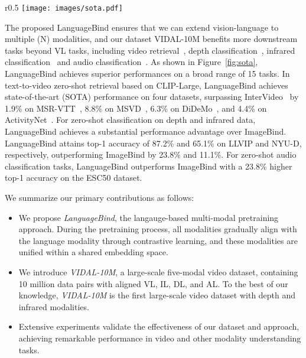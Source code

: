 \documentclass{article} \usepackage{iclr2024_conference,times}
\begin{document}
\begin{wrapfigure}{r}{0.5\textwidth} 
\centering
    \texttt{[image: images/sota.pdf]} 
    \caption{LanguageBind achieves superior performances on a broad range of \textbf{15 benchmarks} across video, audio, depth and infrared.} \label{fig:sota}
\end{wrapfigure}
The proposed LanguageBind ensures that we can extend vision-language to multiple (N) modalities, and our dataset VIDAL-10M benefits more downstream tasks beyond VL tasks, including video retrieval~\citep{luo2022clip4clip}, depth classification~\citep{cao2017estimating}, infrared classification~\citep{baffa2018convolutional} and audio classification~\citep{palanisamy2020rethinking}. As shown in Figure~\ref{fig:sota}, LanguageBind achieves superior performances on a broad range of 15 tasks. In text-to-video zero-shot retrieval based on CLIP-Large, LanguageBind achieves state-of-the-art (SOTA) performance on four datasets, surpassing InterVideo~\citep{wang2022internvideo} by 1.9\% on MSR-VTT~\citep{xu2016msr}, 8.8\% on MSVD~\citep{chen2011collecting}, 6.3\% on DiDeMo~\citep{anne2017localizing}, and 4.4\% on ActivityNet~\citep{caba2015activitynet}. For zero-shot classification on depth and infrared data, LanguageBind achieves a substantial performance advantage over ImageBind. LanguageBind attains top-1 accuracy of 87.2\% and 65.1\% on LLVIP and NYU-D, respectively, outperforming ImageBind by 23.8\% and 11.1\%. For zero-shot audio classification tasks, LanguageBind outperforms ImageBind with a 23.8\% higher top-1 accuracy on the ESC50 dataset.


We summarize our primary contributions as follows:
\begin{itemize}
\item We propose \textit{LanguageBind}, the langauge-based multi-modal pretraining approach. During the pretraining process, all modalities gradually align with the language modality through contrastive learning, and these modalities are unified within a shared embedding space. 
\item We introduce \textit{VIDAL-10M}, a large-scale five-modal video dataset, containing 10 million data pairs with aligned VL, IL, DL, and AL. To the best of our knowledge, \textit{VIDAL-10M} is the first large-scale video dataset with depth and infrared modalities.
\item Extensive experiments validate the effectiveness of our dataset and approach, achieving remarkable performance in video and other modality understanding tasks.
\end{itemize}
\end{document}
